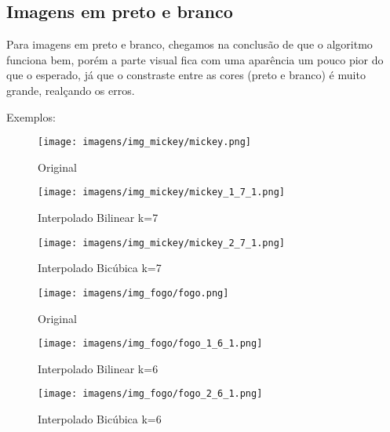 \documentclass[12pt]{article}
\begin{document}
\subsection{Imagens em preto e branco}
Para imagens em preto e branco, chegamos na conclusão de que o algoritmo funciona bem, porém a parte visual fica com uma aparência um pouco pior do que o esperado, já que o constraste entre as cores (preto e branco) é muito grande, realçando os erros.

Exemplos:
\begin{figure}[H]
  \centering
  \begin{minipage}{.5\textwidth}
    \centering
    \texttt{[image: imagens/img\_mickey/mickey.png]}
    \caption{Original}
  \end{minipage}
  \begin{minipage}{.5\linewidth}
  \end{minipage}
  \begin{minipage}{.5\textwidth}
    \centering
    \texttt{[image: imagens/img\_mickey/mickey\_1\_7\_1.png]}
    \caption{Interpolado Bilinear k=7}
  \end{minipage}%
  \begin{minipage}{.5\textwidth}
    \centering
    \texttt{[image: imagens/img\_mickey/mickey\_2\_7\_1.png]}
    \caption{Interpolado Bicúbica k=7}
  \end{minipage}
\end{figure}

\begin{figure}[H]
  \centering
  \begin{minipage}{.5\textwidth}
    \centering
    \texttt{[image: imagens/img\_fogo/fogo.png]}
    \caption{Original}
  \end{minipage}
  \begin{minipage}{.5\linewidth}
  \end{minipage}
  \begin{minipage}{.5\textwidth}
    \centering
    \texttt{[image: imagens/img\_fogo/fogo\_1\_6\_1.png]}
    \caption{Interpolado Bilinear k=6}
  \end{minipage}%
  \begin{minipage}{.5\textwidth}
    \centering
    \texttt{[image: imagens/img\_fogo/fogo\_2\_6\_1.png]}
    \caption{Interpolado Bicúbica k=6}
  \end{minipage}
\end{figure}
\end{document}
